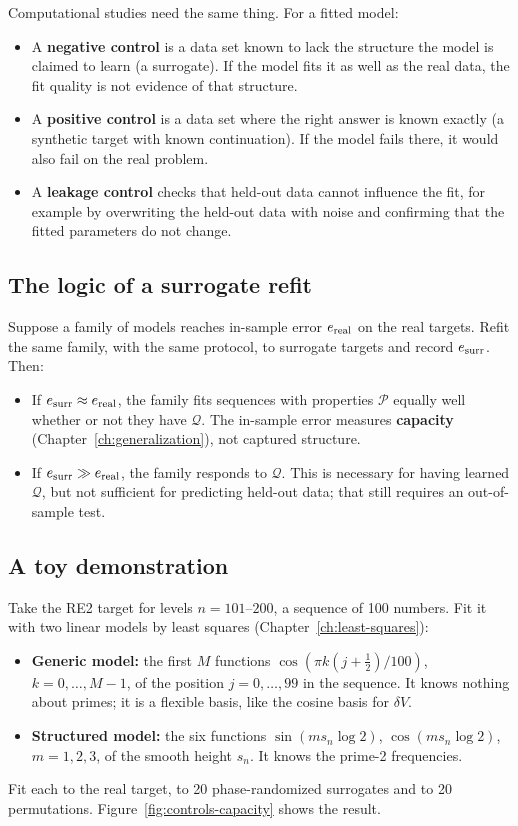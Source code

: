 Computational studies need the same thing. For a fitted model:
\begin{itemize}
\item A \textbf{negative control} is a data set known to lack the structure the model is claimed to learn (a surrogate). If the model fits it as well as the real data, the fit quality is not evidence of that structure.
\item A \textbf{positive control} is a data set where the right answer is known exactly (a synthetic target with known continuation). If the model fails there, it would also fail on the real problem.
\item A \textbf{leakage control} checks that held-out data cannot influence the fit, for example by overwriting the held-out data with noise and confirming that the fitted parameters do not change.
\end{itemize}

\subsection{The logic of a surrogate refit}

Suppose a family of models reaches in-sample error $e_{\rm real}$ on the real targets. Refit the same family, with the same protocol, to surrogate targets and record $e_{\rm surr}$. Then:
\begin{itemize}
\item If $e_{\rm surr}\approx e_{\rm real}$, the family fits sequences with properties $\mathcal P$ equally well whether or not they have $\mathcal Q$. The in-sample error measures \textbf{capacity} (Chapter~\ref{ch:generalization}), not captured structure.
\item If $e_{\rm surr}\gg e_{\rm real}$, the family responds to $\mathcal Q$. This is necessary for having learned $\mathcal Q$, but not sufficient for predicting held-out data; that still requires an out-of-sample test.
\end{itemize}

\subsection{A toy demonstration}

Take the RE2 target for levels $n=101$--$200$, a sequence of 100 numbers. Fit it with two linear models by least squares (Chapter~\ref{ch:least-squares}):
\begin{itemize}
\item \textbf{Generic model:} the first $M$ functions $\cos(\pi k(j+\tfrac12)/100)$, $k=0,\dots,M-1$, of the position $j=0,\dots,99$ in the sequence. It knows nothing about primes; it is a flexible basis, like the cosine basis for $\delta V$.
\item \textbf{Structured model:} the six functions $\sin(m s_n\log2)$, $\cos(m s_n\log2)$, $m=1,2,3$, of the smooth height $s_n$. It knows the prime-2 frequencies.
\end{itemize}
Fit each to the real target, to 20 phase-randomized surrogates and to 20 permutations. Figure~\ref{fig:controls-capacity} shows the result.

